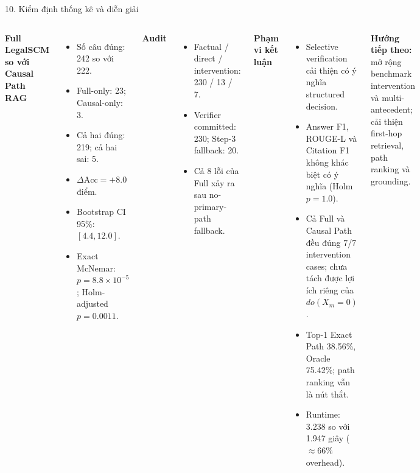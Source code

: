 \documentclass[aspectratio=169,10pt]{beamer}
\begin{document}
\begin{frame}{10. Kiểm định thống kê và diễn giải}
\begin{columns}[T,onlytextwidth]
\textbf{Full LegalSCM so với Causal Path RAG}
\begin{itemize}\small
  \item Số câu đúng: 242 so với 222.
  \item Full-only: 23; Causal-only: 3.
  \item Cả hai đúng: 219; cả hai sai: 5.
  \item $\Delta\mathrm{Acc}=+8.0$ điểm.
  \item Bootstrap CI 95\%: $[4.4,12.0]$.
  \item Exact McNemar: $p=8.8\times10^{-5}$; Holm-adjusted $p=0.0011$.
\end{itemize}

\medskip
\textbf{Audit}
\begin{itemize}\small
  \item Factual / direct / intervention: 230 / 13 / 7.
  \item Verifier committed: 230; Step-3 fallback: 20.
  \item Cả 8 lỗi của Full xảy ra sau no-primary-path fallback.
\end{itemize}

\textbf{Phạm vi kết luận}
\begin{itemize}\small
  \item Selective verification cải thiện có ý nghĩa structured decision.
  \item Answer F1, ROUGE-L và Citation F1 không khác biệt có ý nghĩa (Holm $p=1.0$).
  \item Cả Full và Causal Path đều đúng 7/7 intervention cases; chưa tách được lợi ích riêng của $do(X_m=0)$.
  \item Top-1 Exact Path 38.56\%, Oracle 75.42\%; path ranking vẫn là nút thắt.
  \item Runtime: 3.238 so với 1.947 giây ($\approx66\%$ overhead).
\end{itemize}

\medskip
\textbf{Hướng tiếp theo:} mở rộng benchmark intervention và multi-antecedent; cải thiện first-hop retrieval, path ranking và grounding.
\end{columns}
\end{frame}
\end{document}
